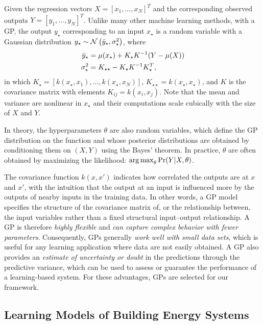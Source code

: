 Given the regression vectors \(X = [x_1, \dots, x_N]^T\) and the corresponding observed outputs \(Y = [y_1, \dots, y_N]^T\).
Unlike many other machine learning methods, with a GP, the output \(y_\star\) corresponding to an input \(x_\star\) is a random variable with a Gaussian distribution \(y_{\star} \sim \operatorname*{\mathcal{N}}\left(\bar{y}_\star, \sigma_\star^2\right)\), where
\begin{subequations}
\label{eq:gp-regression}
\begin{align}
\bar{y}_\star &= \mu(x_\star) + K_\star K^{-1} (Y - \mu(X))\\
\sigma_\star^2 &= K_{\star \star} - K_\star K^{-1} K_\star^T \text,
\end{align}
\end{subequations}
in which \(K_\star = [k(x_\star, x_1), \dots, k(x_\star, x_N)]\), \(K_{\star \star} = k(x_\star, x_\star)\), and $K$ is the covariance matrix with elements \(K_{ij} = k(x_i, x_j)\).
Note that the mean and variance are nonlinear in $x_{\star}$ and their computations scale cubically with the size of $X$ and $Y$.

In theory, the hyperparameters $\theta$ are also random variables, which define the GP distribution on the function and whose posterior distributions are obtained by conditioning them on $(X,Y)$ using the Bayes' theorem.
In practice, $\theta$ are often obtained by maximizing the likelihood: \(\operatorname*{arg\,max}_\theta \Pr(Y \vert X, \theta)\).

The covariance function \(k(x,x')\) indicates how correlated the outputs are at \(x\) and \(x'\), with the intuition that the output at an input is influenced more by the outputs of nearby inputs in the training data. 
In other words, a GP model specifies the structure of the covariance matrix of, or the relationship between, the input variables rather than a fixed structural input--output relationship.
A GP is therefore \emph{highly flexible} and \emph{can capture complex behavior with fewer parameters}.
Consequently, GPs generally \emph{work well with small data sets}, which is useful for any learning application where data are not easily obtained.
A GP also provides an \emph{estimate of uncertainty or doubt} in the predictions through the predictive variance, which can be used to assess or guarantee the performance of a learning-based system.
For these advantages, GPs are selected for our framework.

\subsection{Learning Models of Building Energy Systems} %
\label{sec:modeling:building}

